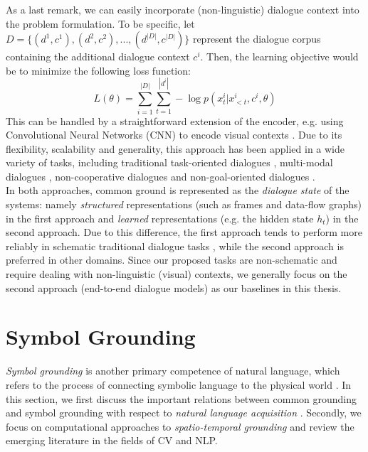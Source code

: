 As a last remark, we can easily incorporate (non-linguistic) dialogue context into the problem formulation. To be specific, let $D = \{(d^1, c^1), (d^2, c^2), ..., (d^{|D|}, c^{|D|})\}$ represent the dialogue corpus containing the additional dialogue context $c^i$. Then, the learning objective would be to minimize the following loss function:
%
\begin{equation}\label{eqt:sequence_to_sequence_with_context}
L(\theta) = \sum_{i = 1}^{|D|} \sum_{t = 1}^{|d^i|} - \log p(x^i_t | x^i_{<t}, c^i, \theta)
\end{equation}
%
This can be handled by a straightforward extension of the encoder, e.g. using Convolutional Neural Networks (CNN) to encode visual contexts \citep{NIPS2012_c399862d,xu2015show}. Due to its flexibility, scalability and generality, this approach has been applied in a wide variety of tasks, including traditional task-oriented dialogues \citep{bordes2017learning,wen-etal-2017-network,ham-etal-2020-end}, multi-modal dialogues \citep{das2017visdialrl,Kottur_2018_ECCV,NEURIPS2019_c74d97b0}, non-cooperative dialogues \citep{lewis-etal-2017-deal,DBLP:conf/icml/YaratsL18,li2020noncollaborative} and non-goal-oriented dialogues \citep{vinyals2015neural,adiwardana2020towards,roller-etal-2021-recipes}.\\

In both approaches, common ground is represented as the \textit{dialogue state} of the systems: namely \textit{structured} representations (such as frames and data-flow graphs) in the first approach and \textit{learned} representations (e.g. the hidden state $h_t$) in the second approach. Due to this difference, the first approach tends to perform more reliably in schematic traditional dialogue tasks \citep{takanobu-etal-2020-goal}, while the second approach is preferred in other domains. Since our proposed tasks are non-schematic and require dealing with non-linguistic (visual) contexts, we generally focus on the second approach (end-to-end dialogue models) as our baselines in this thesis.

\section{Symbol Grounding}
\label{02_sec:symbol_grounding}

\textit{Symbol grounding} is another primary competence of natural language, which refers to the process of connecting symbolic language to the physical world \citep{harnad1990symbol}. In this section, we first discuss the important relations between common grounding and symbol grounding with respect to \textit{natural language acquisition} \citep{tomasello2009constructing}. Secondly, we focus on computational approaches to \textit{spatio-temporal grounding} and review the emerging literature in the fields of CV and NLP. 

